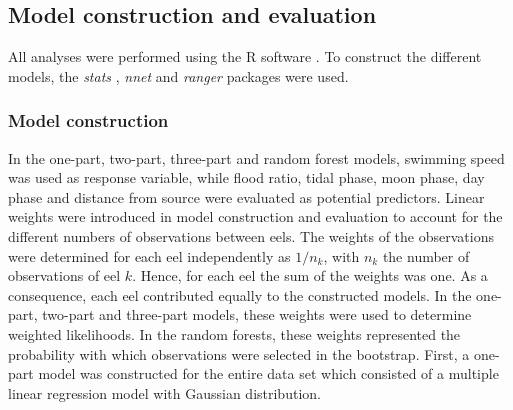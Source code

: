 \documentclass[preprint,12pt,authoryear]{elsarticle}
\begin{document}
\subsection{Model construction and evaluation}

All analyses were performed using the R software \citep{RCoreTeam2019R:Computing}. To construct the different models, the \textit{stats} \citep{RCoreTeam2019R:Computing}, \textit{nnet} \citep{Venables2002ModernS} and \textit{ranger}\citep{Wright2014Ranger:R} packages were used. 

\subsubsection{Model construction}

In the one-part, two-part, three-part and random forest models, swimming speed was used as response variable, while flood ratio, tidal phase, moon phase, day phase and distance from source were evaluated as potential predictors. Linear weights were introduced in model construction and evaluation to account for the different numbers of observations between eels. The weights of the observations were determined for each eel independently as $1/n_{k}$, with $n_{k}$ the number of observations of eel $k$. Hence, for each eel the sum of the weights was one. As a consequence, each eel contributed equally to the constructed models. In the one-part, two-part and three-part models, these weights were used to determine weighted likelihoods. In the random forests, these weights represented the probability with which observations were selected in the bootstrap. First, a one-part model was constructed for the entire data set which consisted of a multiple linear regression model with Gaussian distribution. 
\end{document}
